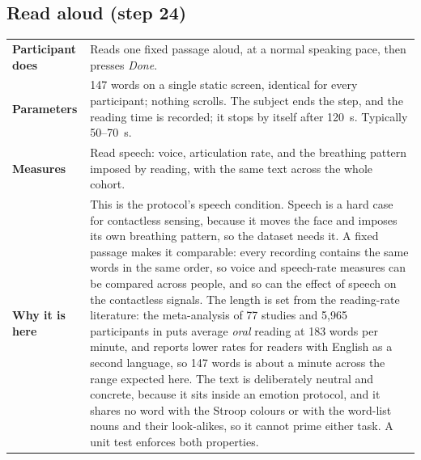 \documentclass[11pt,a4paper]{article}
\makeatletter
\newcommand{\taskdetail}[4]{%
  \begin{tabularx}{\linewidth}{@{}>{\bfseries}p{3.1cm}X@{}}
    Participant does & #1 \\
    Parameters & #2 \\
    Measures & #3 \\
    Why it is here & #4 \\
  \end{tabularx}}
\makeatother
\begin{document}
\subsection{Read aloud (step 24)}
\taskdetail
{Reads one fixed passage aloud, at a normal speaking pace, then presses \emph{Done}.}
{147 words on a single static screen, identical for every participant; nothing scrolls. The subject ends the step,
and the reading time is recorded; it stops by itself after 120~s. Typically 50--70~s.}
{Read speech: voice, articulation rate, and the breathing pattern imposed by reading, with the same text across
the whole cohort.}
{This is the protocol's speech condition. Speech is a hard case for contactless sensing, because it moves the face
and imposes its own breathing pattern, so the dataset needs it. A fixed passage makes it comparable: every
recording contains the same words in the same order, so voice and speech-rate measures can be compared across
people, and so can the effect of speech on the contactless signals. The length is set from the reading-rate
literature: the meta-analysis of 77 studies and 5{,}965 participants in \cite{brysbaert2019} puts average
\emph{oral} reading at 183 words per minute, and reports lower rates for readers with English as a second language,
so 147 words is about a minute across the range expected here. The text is deliberately neutral and concrete,
because it sits inside an emotion protocol, and it shares no word with the Stroop colours or with the word-list
nouns and their look-alikes, so it cannot prime either task. A unit test enforces both properties.}
\end{document}
